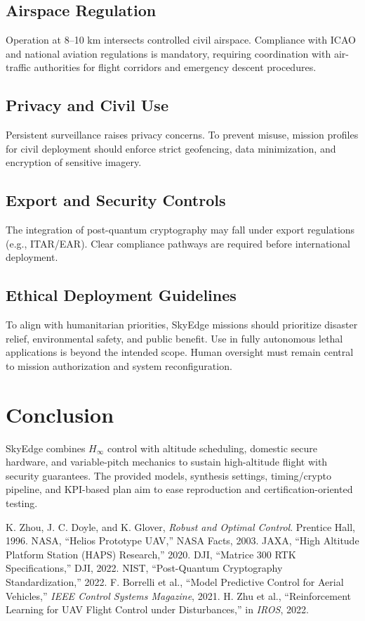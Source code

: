 \documentclass[conference]{IEEEtran}
\begin{document}
\subsection{Airspace Regulation}
Operation at 8--10 km intersects controlled civil airspace. Compliance
with ICAO and national aviation regulations is mandatory, requiring
coordination with air-traffic authorities for flight corridors and
emergency descent procedures.  

\subsection{Privacy and Civil Use}
Persistent surveillance raises privacy concerns. To prevent misuse,
mission profiles for civil deployment should enforce strict geofencing,
data minimization, and encryption of sensitive imagery.  

\subsection{Export and Security Controls}
The integration of post-quantum cryptography may fall under export
regulations (e.g., ITAR/EAR). Clear compliance pathways are required
before international deployment.  

\subsection{Ethical Deployment Guidelines}
To align with humanitarian priorities, SkyEdge missions should
prioritize disaster relief, environmental safety, and public benefit.
Use in fully autonomous lethal applications is beyond the intended
scope. Human oversight must remain central to mission authorization and
system reconfiguration.  

\section{Conclusion}
SkyEdge combines $H_\infty$ control with altitude scheduling, domestic secure hardware, and variable-pitch mechanics to sustain high-altitude flight with security guarantees. The provided models, synthesis settings, timing/crypto pipeline, and KPI-based plan aim to ease reproduction and certification-oriented testing.

\balance

\begin{thebibliography}{99}
 K. Zhou, J. C. Doyle, and K. Glover, \emph{Robust and Optimal Control}. Prentice Hall, 1996.
 NASA, ``Helios Prototype UAV,'' NASA Facts, 2003.
 JAXA, ``High Altitude Platform Station (HAPS) Research,'' 2020.
 DJI, ``Matrice 300 RTK Specifications,'' DJI, 2022.
 NIST, ``Post-Quantum Cryptography Standardization,'' 2022.
 F. Borrelli et al., ``Model Predictive Control for Aerial Vehicles,'' \emph{IEEE Control Systems Magazine}, 2021.
 H. Zhu et al., ``Reinforcement Learning for UAV Flight Control under Disturbances,'' in \emph{IROS}, 2022.
\end{thebibliography}
\end{document}
